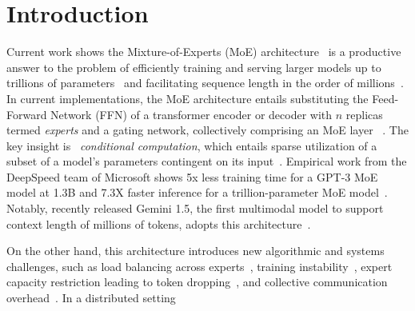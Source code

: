 
\section{Introduction}\label{sec:introduction}
Current work shows the Mixture-of-Experts (MoE) architecture~\cite{10.1162/neco.1991.3.1.79}
is a productive answer to the problem of efficiently training and serving larger models
up to trillions of parameters~\cite{DBLP:journals/corr/abs-2101-03961} and facilitating sequence length in the order of
millions~\cite{Gemini_Team_2024}.
In current implementations, the MoE architecture entails substituting the Feed-Forward Network (FFN) of a transformer
encoder or decoder with $n$ replicas termed \emph{experts} and a gating network, collectively comprising an MoE layer
~\cite{ShazeerMMDLHD17}.
The key insight is ~\emph{conditional computation}, which entails sparse utilization
of a subset of a model’s parameters contingent on its input~\cite{doi:10.1142/S0218001403002411}.
Empirical work from the DeepSpeed team of Microsoft shows 5x less training time for a GPT-3 MoE model at 1.3B and
7.3X faster inference for a trillion-parameter MoE model~\cite{pmlr-v162-rajbhandari22a}.
Notably, recently released Gemini 1.5, the first multimodal model to support context length of millions of tokens,
adopts this architecture~\cite{Gemini_Team_2024}.

On the other hand, this architecture introduces new algorithmic and systems challenges,
such as load balancing across experts~\cite{ShazeerMMDLHD17}, training instability~\cite{NEURIPS2022_3e67e84a},
expert capacity restriction leading to token dropping~\cite{gale2022megablocks},
and collective communication overhead~\cite{DBLP:journals/corr/abs-2006-16668}.
In a distributed setting
